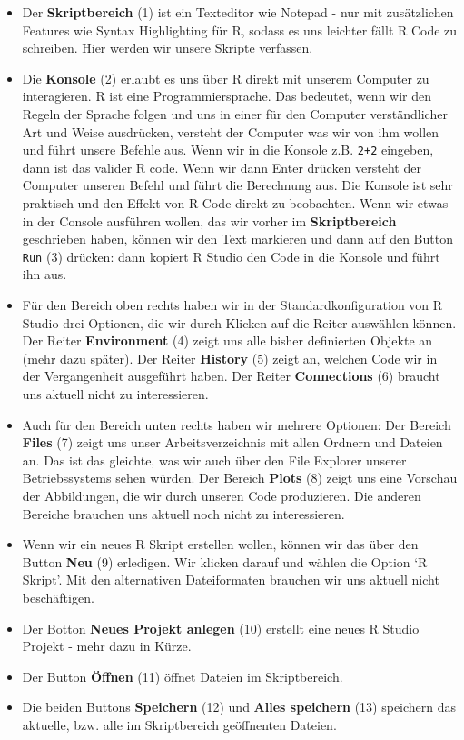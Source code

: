 \documentclass[]{tufte-book}
\begin{document}
\begin{itemize}
\item
  Der \textbf{Skriptbereich} (1) ist ein Texteditor wie Notepad - nur
  mit zusätzlichen Features wie Syntax Highlighting für R, sodass es uns
  leichter fällt R Code zu schreiben. Hier werden wir unsere Skripte
  verfassen.
\item
  Die \textbf{Konsole} (2) erlaubt es uns über R direkt mit unserem
  Computer zu interagieren. R ist eine Programmiersprache. Das bedeutet,
  wenn wir den Regeln der Sprache folgen und uns in einer für den
  Computer verständlicher Art und Weise ausdrücken, versteht der
  Computer was wir von ihm wollen und führt unsere Befehle aus. Wenn wir
  in die Konsole z.B. \texttt{2+2} eingeben, dann ist das valider R
  code. Wenn wir dann Enter drücken versteht der Computer unseren Befehl
  und führt die Berechnung aus. Die Konsole ist sehr praktisch und den
  Effekt von R Code direkt zu beobachten. Wenn wir etwas in der Console
  ausführen wollen, das wir vorher im \textbf{Skriptbereich} geschrieben
  haben, können wir den Text markieren und dann auf den Button
  \texttt{Run} (3) drücken: dann kopiert R Studio den Code in die
  Konsole und führt ihn aus.
\item
  Für den Bereich oben rechts haben wir in der Standardkonfiguration von
  R Studio drei Optionen, die wir durch Klicken auf die Reiter auswählen
  können. Der Reiter \textbf{Environment} (4) zeigt uns alle bisher
  definierten Objekte an (mehr dazu später). Der Reiter \textbf{History}
  (5) zeigt an, welchen Code wir in der Vergangenheit ausgeführt haben.
  Der Reiter \textbf{Connections} (6) braucht uns aktuell nicht zu
  interessieren.
\item
  Auch für den Bereich unten rechts haben wir mehrere Optionen: Der
  Bereich \textbf{Files} (7) zeigt uns unser Arbeitsverzeichnis mit
  allen Ordnern und Dateien an. Das ist das gleichte, was wir auch über
  den File Explorer unserer Betriebssystems sehen würden. Der Bereich
  \textbf{Plots} (8) zeigt uns eine Vorschau der Abbildungen, die wir
  durch unseren Code produzieren. Die anderen Bereiche brauchen uns
  aktuell noch nicht zu interessieren.
\item
  Wenn wir ein neues R Skript erstellen wollen, können wir das über den
  Button \textbf{Neu} (9) erledigen. Wir klicken darauf und wählen die
  Option `R Skript'. Mit den alternativen Dateiformaten brauchen wir uns
  aktuell nicht beschäftigen.
\item
  Der Botton \textbf{Neues Projekt anlegen} (10) erstellt eine neues R
  Studio Projekt - mehr dazu in Kürze.
\item
  Der Button \textbf{Öffnen} (11) öffnet Dateien im Skriptbereich.
\item
  Die beiden Buttons \textbf{Speichern} (12) und \textbf{Alles
  speichern} (13) speichern das aktuelle, bzw. alle im Skriptbereich
  geöffnenten Dateien.
\end{itemize}
\end{document}
